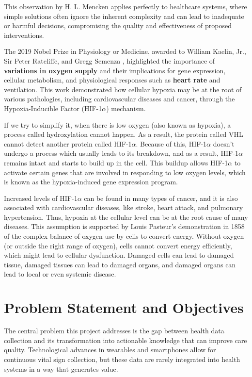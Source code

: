 This observation by H. L. Mencken applies perfectly to healthcare systems, where simple solutions often ignore the inherent complexity and can lead to inadequate or harmful decisions, compromising the quality and effectiveness of proposed interventions.

The 2019 Nobel Prize in Physiology or Medicine, awarded to William Kaelin, Jr., Sir Peter Ratcliffe, and Gregg Semenza \cite{Nobel_Prize}, highlighted the importance of \textbf{variations in oxygen supply} and their implications for gene expression, cellular metabolism, and physiological responses such as \textbf{heart rate} and ventilation. This work demonstrated how cellular hypoxia may be at the root of various pathologies, including cardiovascular diseases and cancer, through the Hypoxia-Inducible Factor (HIF-1$\alpha$) mechanism.

If we try to simplify it, when there is low oxygen (also known as hypoxia), a process called hydroxylation cannot happen. As a result, the protein called VHL cannot detect another protein called HIF-1$\alpha$. Because of this, HIF-1$\alpha$ doesn't undergo a process which usually leads to its breakdown, and as a result, HIF-1$\alpha$ remains intact and starts to build up in the cell. This buildup allows HIF-1$\alpha$ to activate certain genes that are involved in responding to low oxygen levels, which is known as the hypoxia-induced gene expression program.

Increased levels of HIF-1$\alpha$ can be found in many types of cancer, and it is also associated with cardiovascular diseases, like stroke, heart attack, and pulmonary hypertension. Thus, hypoxia at the cellular level can be at the root cause of many diseases. This assumption is supported by Louis Pasteur's demonstration in 1858 of the complex balance of oxygen use by cells to convert energy. Without oxygen (or outside the right range of oxygen), cells cannot convert energy efficiently, which might lead to cellular dysfunction. Damaged cells can lead to damaged tissue, damaged tissues can lead to damaged organs, and damaged organs can lead to local or even systemic disease.

\section{Problem Statement and Objectives} \label{sec:goals}

The central problem this project addresses is the gap between health data collection and its transformation into actionable knowledge that can improve care quality. Technological advances in wearables and smartphones allow for continuous vital sign collection, but these data are rarely integrated into health systems in a way that generates value.

